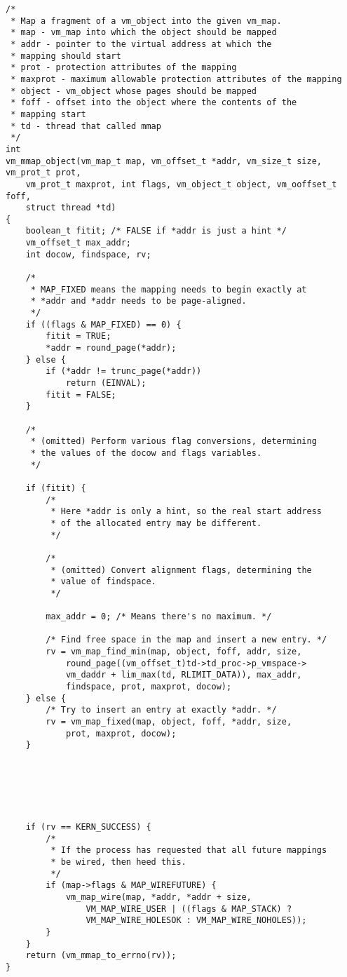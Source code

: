 \documentclass[shortabstract, english]{iithesis}
\newenvironment{code}{}{}
\begin{document}
\begin{code}
\begin{verbatim}
/*
 * Map a fragment of a vm_object into the given vm_map.
 * map - vm_map into which the object should be mapped
 * addr - pointer to the virtual address at which the
 * mapping should start
 * prot - protection attributes of the mapping
 * maxprot - maximum allowable protection attributes of the mapping
 * object - vm_object whose pages should be mapped
 * foff - offset into the object where the contents of the
 * mapping start
 * td - thread that called mmap
 */
int
vm_mmap_object(vm_map_t map, vm_offset_t *addr, vm_size_t size, vm_prot_t prot,
    vm_prot_t maxprot, int flags, vm_object_t object, vm_ooffset_t foff,
    struct thread *td)
{
    boolean_t fitit; /* FALSE if *addr is just a hint */
    vm_offset_t max_addr;
    int docow, findspace, rv;

    /*
     * MAP_FIXED means the mapping needs to begin exactly at
     * *addr and *addr needs to be page-aligned.
     */
    if ((flags & MAP_FIXED) == 0) {
        fitit = TRUE;
        *addr = round_page(*addr);
    } else {
        if (*addr != trunc_page(*addr))
            return (EINVAL);
        fitit = FALSE;
    }

    /*
     * (omitted) Perform various flag conversions, determining
     * the values of the docow and flags variables.
     */

    if (fitit) {
        /*
         * Here *addr is only a hint, so the real start address
         * of the allocated entry may be different.
         */

        /*
         * (omitted) Convert alignment flags, determining the
         * value of findspace.
         */

        max_addr = 0; /* Means there's no maximum. */

        /* Find free space in the map and insert a new entry. */
        rv = vm_map_find_min(map, object, foff, addr, size,
            round_page((vm_offset_t)td->td_proc->p_vmspace->
            vm_daddr + lim_max(td, RLIMIT_DATA)), max_addr,
            findspace, prot, maxprot, docow);
    } else {
        /* Try to insert an entry at exactly *addr. */
        rv = vm_map_fixed(map, object, foff, *addr, size,
            prot, maxprot, docow);
    }






    if (rv == KERN_SUCCESS) {
        /*
         * If the process has requested that all future mappings
         * be wired, then heed this.
         */
        if (map->flags & MAP_WIREFUTURE) {
            vm_map_wire(map, *addr, *addr + size,
                VM_MAP_WIRE_USER | ((flags & MAP_STACK) ?
                VM_MAP_WIRE_HOLESOK : VM_MAP_WIRE_NOHOLES));
        }
    }
    return (vm_mmap_to_errno(rv));
}
\end{verbatim}
\end{code}
\end{document}
